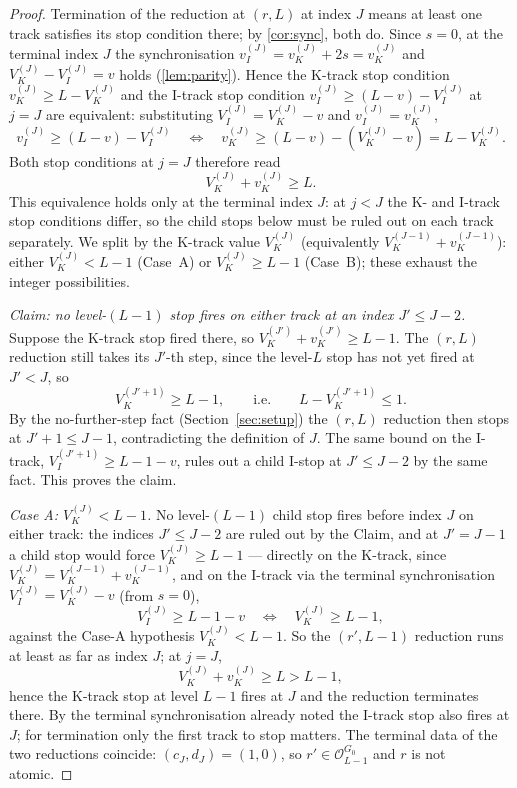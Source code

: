 \documentclass[11pt,reqno]{amsart}
\newcommand{\Obs}{\mathcal{O}}
\newcommand{\Vk}{V_{K}}
\newcommand{\Vi}{V_{I}}
\newcommand{\vk}{v_{K}}
\newcommand{\vi}{v_{I}}
\begin{document}
\begin{proof}
Termination of the reduction at $(r, L)$ at index $J$ means at least one
track satisfies its stop condition there; by \cref{cor:sync}, both
do. Since $s = 0$, at the terminal index $J$ the synchronisation
$\vi^{(J)} = \vk^{(J)} + 2s = \vk^{(J)}$ and
$\Vk^{(J)} - \Vi^{(J)} = v$ holds (\cref{lem:parity}). Hence the
K-track stop condition $\vk^{(J)} \ge L - \Vk^{(J)}$ and the I-track stop
condition $\vi^{(J)} \ge (L - v) - \Vi^{(J)}$ at $j = J$ are equivalent:
substituting $\Vi^{(J)} = \Vk^{(J)} - v$ and $\vi^{(J)} = \vk^{(J)}$,
\[
\vi^{(J)} \ge (L - v) - \Vi^{(J)}
\quad\Longleftrightarrow\quad
\vk^{(J)} \ge (L - v) - (\Vk^{(J)} - v) = L - \Vk^{(J)} .
\]
Both stop conditions at $j = J$ therefore read
\[
\Vk^{(J)} + \vk^{(J)} \ge L .
\]
This equivalence holds only at the terminal index $J$: at $j < J$ the K- and
I-track stop conditions differ, so the child stops below must be ruled out on
each track separately.
We split by the K-track value $\Vk^{(J)}$ (equivalently
$\Vk^{(J-1)} + \vk^{(J-1)}$): either $\Vk^{(J)} < L - 1$ (Case~A) or
$\Vk^{(J)} \ge L - 1$ (Case~B); these exhaust the integer possibilities.

\emph{Claim: no level-$(L-1)$ stop fires on either track at an index
$J' \le J - 2$.} Suppose the K-track stop fired there, so
$\Vk^{(J')} + \vk^{(J')} \ge L - 1$. The $(r, L)$ reduction still takes its
$J'$-th step, since the level-$L$ stop has not yet fired at $J' < J$, so
\[
\Vk^{(J'+1)} \ge L - 1, \qquad\text{i.e.}\qquad L - \Vk^{(J'+1)} \le 1 .
\]
By the no-further-step fact (Section~\ref{sec:setup}) the $(r, L)$ reduction
then stops at $J' + 1 \le J - 1$, contradicting the definition of $J$. The same bound on the I-track,
$\Vi^{(J'+1)} \ge L - 1 - v$, rules out a child I-stop at $J' \le J - 2$ by the
same fact. This proves the claim.

\emph{Case A: $\Vk^{(J)} < L - 1$.} No level-$(L-1)$ child stop fires before
index $J$ on either track: the indices $J' \le J - 2$ are ruled out by the
Claim, and at $J' = J - 1$ a child stop would force $\Vk^{(J)} \ge L - 1$ ---
directly on the K-track, since $\Vk^{(J)} = \Vk^{(J-1)} + \vk^{(J-1)}$, and on
the I-track via the terminal synchronisation $\Vi^{(J)} = \Vk^{(J)} - v$ (from
$s = 0$),
\[
\Vi^{(J)} \ge L - 1 - v \quad\Longleftrightarrow\quad \Vk^{(J)} \ge L - 1,
\]
against the Case-A hypothesis $\Vk^{(J)} < L - 1$. So the $(r', L-1)$ reduction
runs at least as far as index $J$; at $j = J$,
\[
\Vk^{(J)} + \vk^{(J)} \ge L > L - 1,
\]
hence the K-track stop at level $L - 1$ fires at $J$ and the reduction
terminates there. By the terminal
synchronisation already noted the I-track stop also fires at $J$; for
termination only the first track to stop matters. The
terminal data of the two reductions coincide: $(c_J, d_J) = (1, 0)$, so
$r' \in \Obs_{L-1}^{G_0}$ and $r$ is not atomic.


\end{proof}
\end{document}
